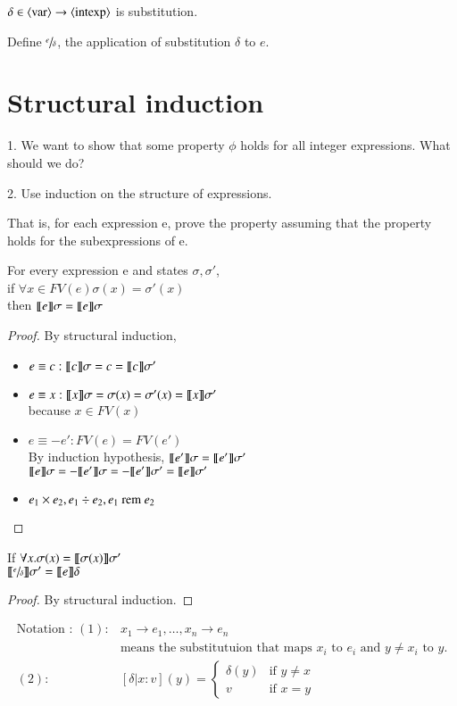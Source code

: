 \documentclass{report}[12pt]
\begin{document}
$\delta \in \langle \text{var}\rangle \rightarrow \langle \text{intexp}\rangle$ is substitution.

Define $\sfrac{e}{\delta}$, the application of substitution $\delta$ to $e$.
\section{Structural induction}
1. We want to show that some property $\phi$ holds for all integer expressions. What should we do?

2. Use induction on the structure of expressions.

That is, for each expression e, prove the property assuming that the property holds for the subexpressions of e.
\begin{lemma}[Coincidence]
    For every expression e and states $\sigma, \sigma'$, \\
    if $\forall x\in FV(e) \sigma(x) = \sigma'(x) $ \\
    then $\llbracket  e  \rrbracket \sigma = \llbracket  e  \rrbracket \sigma$
\end{lemma}
\begin{proof}
    By structural induction,
    \begin{itemize}
        \item $e \equiv c : \llbracket  c  \rrbracket \sigma = c =  \llbracket  c  \rrbracket \sigma' $
        \item $e \equiv x : \llbracket  x  \rrbracket \sigma = \sigma(x) = \sigma'(x) = \llbracket  x  \rrbracket \sigma'$ \\
        because $x \in FV(x)$
        \item $e \equiv -e' : FV(e) = FV(e')$ \\
        By induction hypothesis, $\llbracket  e'  \rrbracket \sigma = \llbracket  e'  \rrbracket \sigma'$ \\
        $\llbracket  e  \rrbracket \sigma = - \llbracket  e'  \rrbracket \sigma = - \llbracket  e'  \rrbracket \sigma' = \llbracket  e  \rrbracket \sigma'$
        \item $e_1 \times e_2, e_1 \div e_2, e_1\text{ rem } e_2$
    \end{itemize}
\end{proof}
\begin{lemma}[Substitution]
    If $\forall x. \sigma(x) = \llbracket  \sigma(x)  \rrbracket \sigma' $ \\
    $\llbracket  \sfrac{e}{\delta}  \rrbracket \sigma' = \llbracket  e  \rrbracket \delta$
\end{lemma}
\begin{proof}
    By structural induction.
\end{proof}
\begin{align*}
    \text{Notation : }(1) : &x_1 \rightarrow e_1, \ldots, x_n \rightarrow e_n \\
    &\text{means the substitutuion that maps } x_i \text{ to }e_i \text{ and }y\neq x_i \text{ to } y. \\
    (2) : &[\delta | x:v] (y) = \begin{cases} \delta(y) & \text{if }y\neq x \\ v &\text{if }x=y\end{cases}
\end{align*}
\end{document}
